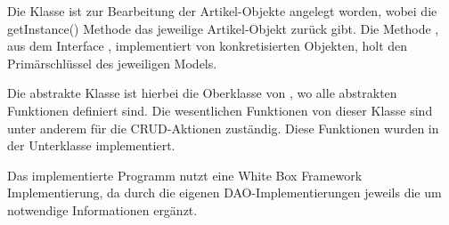 Die Klasse  ist zur Bearbeitung der Artikel-Objekte angelegt
worden, wobei die getInstance() Methode das jeweilige Artikel-Objekt zurück gibt.
Die Methode , aus dem Interface , implementiert
von konkretisierten Objekten, holt den Primärschlüssel des jeweiligen Models.

Die abstrakte Klasse  ist hierbei die Oberklasse von 
, wo alle abstrakten Funktionen definiert sind. Die wesentlichen
Funktionen von dieser Klasse sind unter anderem für die CRUD-Aktionen zuständig.
Diese Funktionen wurden in der Unterklasse  implementiert.

Das implementierte Programm nutzt eine White Box Framework Implementierung, da
durch die eigenen DAO-Implementierungen jeweils die  um
notwendige Informationen ergänzt.

